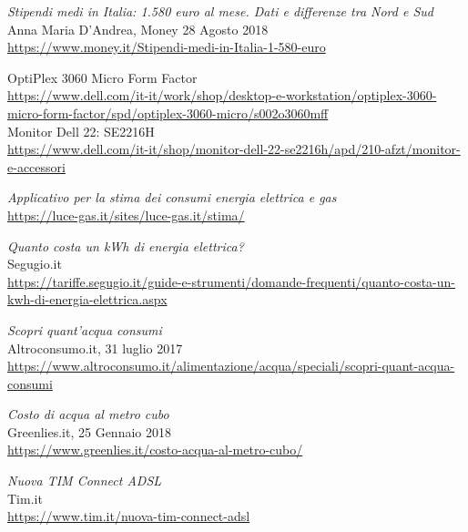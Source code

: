 \begin{thebibliography}{99}
\emph{Stipendi medi in Italia: 1.580 euro al mese. Dati e differenze tra Nord e
Sud} \\
Anna Maria D’Andrea, Money 28 Agosto 2018 \\
\url{https://www.money.it/Stipendi-medi-in-Italia-1-580-euro}

OptiPlex 3060 Micro Form Factor\\
\url{https://www.dell.com/it-it/work/shop/desktop-e-workstation/optiplex-3060-micro-form-factor/spd/optiplex-3060-micro/s002o3060mff}
\\
Monitor Dell 22: SE2216H \\
\url{https://www.dell.com/it-it/shop/monitor-dell-22-se2216h/apd/210-afzt/monitor-e-accessori}

\emph{Applicativo per la stima dei consumi energia elettrica e gas}\\
\url{https://luce-gas.it/sites/luce-gas.it/stima/}

\emph{Quanto costa un kWh di energia elettrica?}\\
Segugio.it\\
\url{https://tariffe.segugio.it/guide-e-strumenti/domande-frequenti/quanto-costa-un-kwh-di-energia-elettrica.aspx}

\emph{Scopri quant'acqua consumi}\\
Altroconsumo.it, 31 luglio 2017 \\
\url{https://www.altroconsumo.it/alimentazione/acqua/speciali/scopri-quant-acqua-consumi}

\emph{Costo di acqua al metro cubo} \\
Greenlies.it, 25 Gennaio 2018 \\
\url{https://www.greenlies.it/costo-acqua-al-metro-cubo/}

\emph{Nuova TIM Connect ADSL} \\
Tim.it \\
\url{https://www.tim.it/nuova-tim-connect-adsl}

\end{thebibliography}
